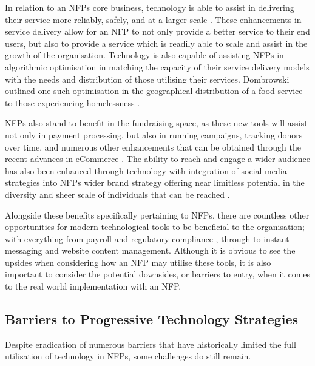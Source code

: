 In relation to an NFPs core business, technology is able to assist in delivering their service more reliably, safely, and at a larger scale \cite{boles2013technology}. These enhancements in service delivery allow for an NFP to not only provide a better service to their end users, but also to provide a service which is readily able to scale and assist in the growth of the organisation. Technology is also capable of assisting NFPs in algorithmic optimisation in matching the capacity of their service delivery models with the needs and distribution of those utilising their services. Dombrowski outlined one such optimisation in the geographical distribution of a food service to those experiencing homelessness \cite{dombrowski2013takes}.

NFPs also stand to benefit in the fundraising space, as these new tools will assist not only in payment processing, but also in running campaigns, tracking donors over time, and numerous other enhancements that can be obtained through the recent advances in eCommerce \cite{goecks2008charitable} \cite{boeder2002non}. The ability to reach and engage a wider audience has also been enhanced through technology with integration of social media strategies into NFPs wider brand strategy offering near limitless potential in the diversity and sheer scale of individuals that can be reached \cite{lovejoy2012information} \cite{nah2013modeling} \cite{wyllie2016examination} \cite{milde2017strategies}.

Alongside these benefits specifically pertaining to NFPs, there are countless other opportunities for modern technological tools to be beneficial to the organisation; with everything from payroll and regulatory compliance \cite{mahajan2015review}, through to instant messaging and website content management. Although it is obvious to see the upsides when considering how an NFP may utilise these tools, it is also important to consider the potential downsides, or barriers to entry, when it comes to the real world implementation with an NFP.

\subsection{Barriers to Progressive Technology Strategies}

Despite eradication of numerous barriers that have historically limited the full utilisation of technology in NFPs, some challenges do still remain. 


